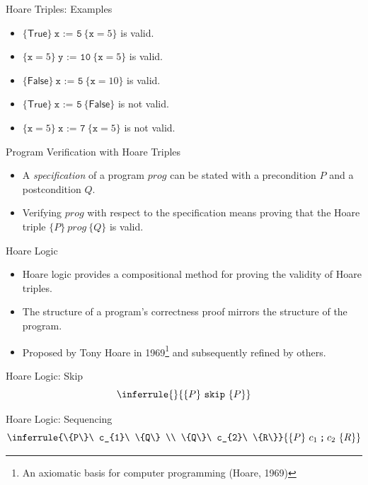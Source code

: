 \documentclass{beamer}
\begin{document}
\begin{frame}{Hoare Triples: Examples}
  \begin{itemize}
    \item $\{\mathsf{True}\}\ \texttt{x := 5}\ \{\texttt{x}=5\}$ is valid.
    \item $\{\texttt{x}=5\}\ \texttt{y := 10}\ \{\texttt{x}=5\}$ is valid.
    \item $\{\mathsf{False}\}\ \texttt{x := 5}\ \{\texttt{x}=10\}$ is valid.
    \item $\{\mathsf{True}\}\ \texttt{x := 5}\ \{\mathsf{False}\}$ is not valid.
    \item $\{\texttt{x}=5\}\ \texttt{x := 7}\ \{\texttt{x}=5\}$ is not valid.
  \end{itemize}
\end{frame}

\begin{frame}{Program Verification with Hoare Triples}
  \begin{itemize}
    \item A \emph{specification} of a program $prog$ can be stated with a
      precondition $P$ and a postcondition $Q$.
    \item Verifying $prog$ with respect to the specification means proving that
      the Hoare triple $\{P\}\ prog\ \{Q\}$ is valid.
  \end{itemize}
\end{frame}

\begin{frame}{Hoare Logic}
  \begin{itemize}
    \item Hoare logic provides a compositional method for proving the validity of Hoare triples.
    \item The structure of a program's correctness proof mirrors the structure of the program.
    \item Proposed by Tony Hoare in 1969\footnote{An axiomatic basis for computer programming (Hoare, 1969)} and subsequently refined by others.
  \end{itemize}
\end{frame}

\begin{frame}{Hoare Logic: Skip}
  \[
    \inferrule{ }{\{P\}\ \texttt{skip}\ \{P\}}
  \]
\end{frame}

\begin{frame}{Hoare Logic: Sequencing}
  \[
    \inferrule{\{P\}\ c_{1}\ \{Q\} \\
               \{Q\}\ c_{2}\ \{R\}}
              {\{P\}\ c_{1}\mathbin{\texttt{;}}c_{2}\ \{R\}}
  \]
\end{frame}
\end{document}
